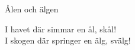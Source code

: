 \begin{song}{Ålen och älgen}
	
	I havet där simmar en ål, skål!\\
	I skogen där springer en älg, svälg!
	
\end{song}

